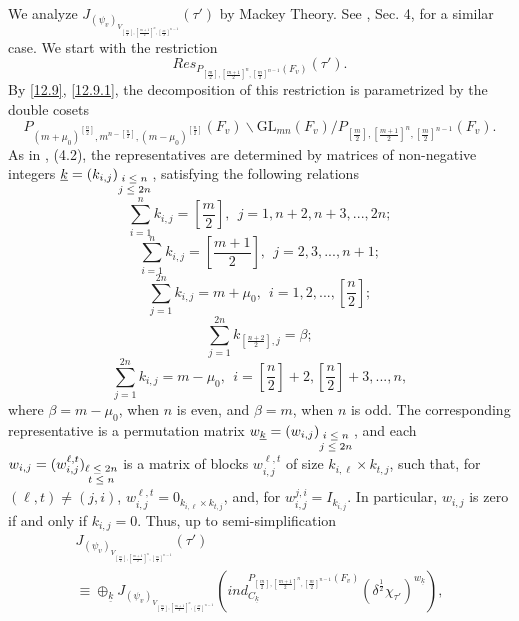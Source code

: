 \documentclass[12pts]{amsart}
\newcommand{\GL}{{\mathrm{GL}}}
\begin{document}
We analyze $J_{(\psi_v)_{V_{[\frac{m}{2}],[\frac{m+1}{2}]^n,[\frac{m}{2}]^{n-1}}}}(\tau')$ by Mackey Theory. See \cite{GJS15}, Sec. 4, for a similar case. We start with the restriction 
$$
Res_{P_{[\frac{m}{2}],[\frac{m+1}{2}]^n,[\frac{m}{2}]^{n-1}}(F_v)}(\tau').
$$ 
By \eqref{12.9}, \eqref{12.9.1}, the decomposition of this restriction is parametrized by the double cosets
$$
P_{(m+\mu_0)^{[\frac{n}{2}]},m^{n-[\frac{n}{2}]}, (m-\mu_0)^{[\frac{n}{2}]}}(F_v)\backslash \GL_{mn}(F_v)/ P_{[\frac{m}{2}],[\frac{m+1}{2}]^n,[\frac{m}{2}]^{n-1}}(F_v).
$$
As in \cite{GJS15}, (4.2), the representatives are determined by matrices of non-negative integers $\underline{k}=(k_{i,j})_{\scriptsize{\begin{matrix}i\leq n\\ j\leq 2n\end{matrix}}}$, satisfying the following relations
\begin{equation}\label{13.1}
\sum_{i=1}^n k_{i,j}=[\frac{m}{2}],\ \ j=1,n+2,n+3,...,2n;
\end{equation}
$$
\sum_{i=1}^n k_{i,j}=[\frac{m+1}{2}],\ \ j=2,3,...,n+1;
$$
$$
\sum_{j=1}^{2n}k_{i,j}=m+\mu_0,\ \ i=1,2,...,[\frac{n}{2}];
$$
$$
\sum_{j=1}^{2n}k_{[\frac{n+2}{2}],j}=\beta;
$$
$$
\sum_{j=1}^{2n}k_{i,j}=m-\mu_0,\ \ i=[\frac{n}{2}]+2,[\frac{n}{2}]+3,...,n,
$$
where $\beta=m-\mu_0$, when $n$ is even, and $\beta=m$, when $n$ is odd. The corresponding representative is a permutation matrix $w_{\underline{k}}=(w_{i,j})_{\scriptsize{\begin{matrix}i\leq n\\j\leq 2n\end{matrix}}}$, and each $w_{i,j}=(w_{i,j}^{\ell,t})_{\scriptsize{\begin{matrix}\ell\leq 2n\\t\leq n\end{matrix}}}$ is a matrix of blocks $w_{i,j}^{\ell,t}$ of size $k_{i,\ell}\times k_{t,j}$, such that, for $(\ell,t)\neq (j,i)$, $w_{i,j}^{\ell,t}=0_{k_{i,\ell}\times k_{t,j}}$, and, for $w_{i,j}^{j,i}=I_{k_{i,j}}$. In particular, $w_{i,j}$ is zero if and only if $k_{i,j}=0$. Thus, up to semi-simplification
\begin{multline}\label{13.2}
J_{(\psi_v)_{V_{[\frac{m}{2}],[\frac{m+1}{2}]^n,[\frac{m}{2}]^{n-1}}}}(\tau')\\
\equiv \oplus_{\underline{k}}
J_{(\psi_v)_{V_{[\frac{m}{2}],[\frac{m+1}{2}]^n,[\frac{m}{2}]^{n-1}}}}(ind^{P_{[\frac{m}{2}],[\frac{m+1}{2}]^n,[\frac{m}{2}]^{n-1}}(F_v)}_{C_{\underline{k}}}(\delta^{\frac{1}{2}}\chi_{\tau'})^{w_{\underline{k}}}),
\end{multline}
\end{document}
